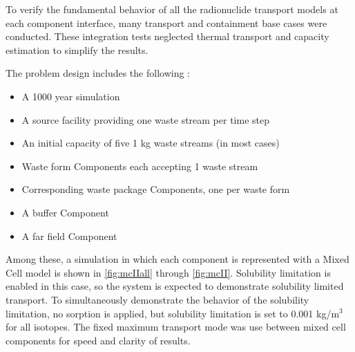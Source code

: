 
To verify the fundamental behavior of all the radionuclide transport models at 
each component interface, many transport and containment base cases were 
conducted.  These integration tests neglected thermal transport and capacity 
estimation to simplify the results.

The problem design includes the following : 
\begin{itemize}
\item{A 1000 year simulation}
\item{A source facility providing one waste stream per time step}
\item{An initial capacity of five 1 kg waste streams (in most cases)}
\item{Waste form Components each accepting 1 waste stream} 
\item{Corresponding waste package Components, one per waste form}
\item{A buffer Component}
\item{A far field Component}

\end{itemize}



Among these, a simulation in which each component is represented with a Mixed
Cell model is shown in \ref{fig:mcIIall} through \ref{fig:mcII}.  Solubility
limitation is enabled in this case, so the system is expected to demonstrate
solubility limited transport.  To simultaneously demonstrate the behavior of
the solubility limitation, no sorption is applied, but solubility limitation is
set to 0.001 kg/m$^3$ for all isotopes.  The fixed maximum transport mode was
use between mixed cell components for speed and clarity of results.



\FloatBarrier

